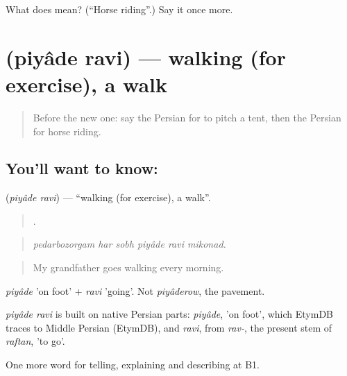 \begin{tcolorbox}[breakable,colback=teal!4,colframe=teal!35!black,title={Before you move on}]
What does   mean? (\textquotedblleft{}Horse riding\textquotedblright{}.) Say it once more.
\end{tcolorbox}
\section[\texorpdfstring{\fa{پیاده} \fa{روی} (piyâde ravi)}{پیاده روی (piyâde ravi)}]{  (piyâde ravi) — walking (for exercise), a walk}

\label{lesson:FA-C511-piyade-ravi}



\begin{quote}
Before the new one: say the Persian for to pitch a tent, then the Persian for horse riding.
\end{quote}

\subsection*{You'll want to know:  }
\textbf{ } (\emph{piyâde ravi}) — \textquotedblleft{}walking (for exercise), a walk\textquotedblright{}.

\begin{quote}
     .
\end{quote}

\begin{quote}
\emph{pedarbozorgam har sobh piyâde ravi mikonad.}
\end{quote}

\begin{quote}
My grandfather goes walking every morning.
\end{quote}

\emph{piyâde} 'on foot' + \emph{ravi} 'going'. Not \emph{piyâderow}, the pavement.

\begin{cousinweb}
\emph{piyâde ravi} is built on native Persian parts: \emph{piyâde}, 'on foot', which EtymDB traces to Middle Persian (EtymDB), and \emph{ravi}, from \emph{rav-}, the present stem of \emph{raftan}, 'to go'.
\end{cousinweb}

\begin{grammarlens}[title={What you've built}]
One more word for telling, explaining and describing at B1.
\end{grammarlens}

